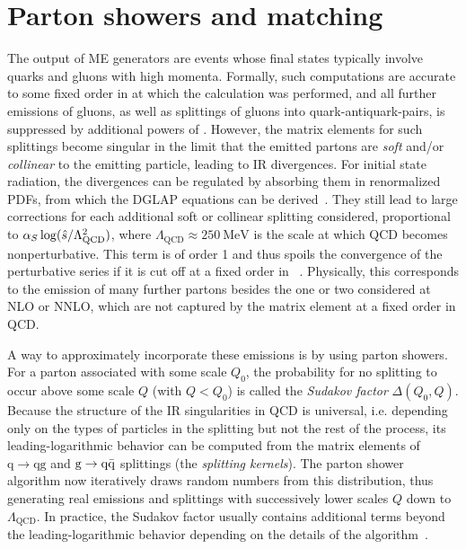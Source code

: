 \section{Parton showers and matching}
\label{sec:mc:showering}


The output of ME generators are events whose final states typically involve quarks and gluons with high momenta. Formally, such computations are accurate to some fixed order in \alphas at which the calculation was performed, and all further emissions of gluons, as well as splittings of gluons into quark-antiquark-pairs, is suppressed by additional powers of \alphas. 
However, the matrix elements for such splittings become singular in the limit that the emitted partons are \textit{soft} and/or \textit{collinear} to the emitting particle, leading to IR divergences. For initial state radiation, the divergences can be regulated by absorbing them in renormalized PDFs, from which the DGLAP equations can be derived~\cite{Skands:2012ts,Schwartz:2014sze}. They still lead to large corrections for each additional soft or collinear splitting considered, 
proportional to $\alpha_S \log( \hat{s} / \Lambda_{\mathrm{QCD}}^2)$, where $\Lambda_{\mathrm{QCD}} \approx \SI{250}{\MeV}$ is the scale at which QCD becomes nonperturbative. This term is of order 1 and thus spoils the convergence of the perturbative series if it is cut off at a fixed order in \alphas~\cite{Peskin:1995ev,Skands:2012ts}.
Physically, this corresponds to the emission of many further partons besides the one or two considered at NLO or NNLO, which are not captured by the matrix element at a fixed order in QCD.

A way to approximately incorporate these emissions is by using parton showers. %
For a parton associated with some scale $Q_0$, the probability for no splitting to occur above some scale $Q$ (with $Q < Q_0$) is called the \textit{Sudakov factor} $\Delta(Q_0,Q)$. Because the structure of the IR singularities in QCD is universal, i.e. depending only on the types of particles in the splitting but not the rest of the process, its leading-logarithmic behavior can be computed from the matrix elements of $\mathrm{q \rightarrow qg}$ and $\mathrm{g \rightarrow \mathrm{q \bar{q}}}$ splittings (the \textit{splitting kernels}).
The parton shower algorithm now iteratively draws random numbers from this distribution, thus generating real emissions and splittings with successively lower scales $Q$ down to $\Lambda_{\mathrm{QCD}}$. In practice, the Sudakov factor usually contains additional terms beyond the leading-logarithmic behavior depending on the details of the algorithm~\cite{Skands:2012ts}.

